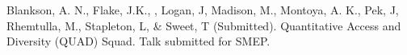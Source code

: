 
\item  Blankson, A. N., Flake, J.K., \meb, Logan, J, Madison, M., Montoya, A. K., Pek, J, Rhemtulla, M., Stapleton, L, \& Sweet, T (Submitted). Quantitative Access and Diversity (QUAD) Squad. Talk submitted for SMEP.
%
%

%

%

%

%
